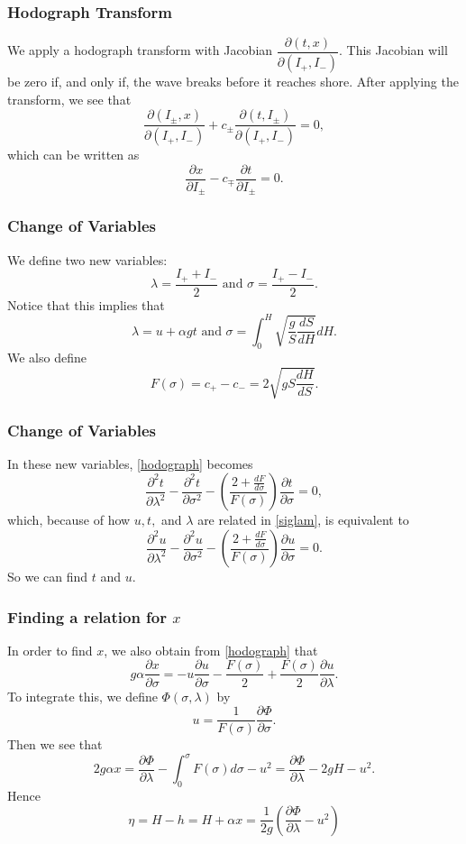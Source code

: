 \documentclass[xcolor=dvipsnames]{beamer}
\begin{document}
\begin{frame}
\frametitle{Hodograph Transform}
We apply a hodograph transform with Jacobian $\dfrac{\partial (t,x)}{\partial(I_+, I_-)}$. This Jacobian will be zero if, and only if, the wave breaks before it reaches shore. After applying the transform, we see that
\[
\frac{\partial(I_\pm,x)}{\partial(I_+,I_-)} + c_\pm \frac{\partial (t, I_\pm)}{\partial(I_+,I_-)} = 0,
\]
which can be written as
\begin{equation}\label{hodograph}
\frac{\partial x}{\partial I_\pm} - c_\mp \frac{\partial t}{\partial I_\pm} = 0.
\end{equation}
\end{frame}

\begin{frame}
\frametitle{Change of Variables}
We define two new variables:
\[
\lambda = \frac{I_+ + I_-}{2} \text{ and } \sigma = \frac{I_+ - I_-}{2}.
\]
Notice that this implies that
\begin{equation} \label{siglam}
\lambda = u + \alpha g t \text{ and } \sigma = \int_0^H \sqrt{\frac{g}{S} \frac{dS}{dH}}dH.
\end{equation}
We also define
\[
F(\sigma) = c_+ - c_- = 2 \sqrt{gS \frac{dH}{dS}}.
\]
\end{frame}

\begin{frame}
\frametitle{Change of Variables}
In these new variables, \eqref{hodograph} becomes
\[
\frac{\partial^2 t}{\partial \lambda^2} - \frac{\partial^2 t}{\partial \sigma^2} - \left( \frac{2 + \frac{dF}{d\sigma}}{F(\sigma)} \right) \frac{\partial t}{\partial \sigma} = 0,
\]
which, because of how $u,t,$ and $\lambda$ are related in \eqref{siglam}, is equivalent to
\begin{equation}\label{finalu}
\frac{\partial^2 u}{\partial \lambda^2} - \frac{\partial^2 u}{\partial \sigma^2} - \left( \frac{2 + \frac{dF}{d\sigma}}{F(\sigma)} \right) \frac{\partial u}{\partial \sigma} = 0.
\end{equation}
So we can find $t$ and $u$.
\end{frame}

\begin{frame}
\frametitle{Finding a relation for $x$}
In order to find $x$, we also obtain from \eqref{hodograph} that
\[
g \alpha \frac{\partial x}{\partial \sigma} = - u \frac{\partial u}{\partial \sigma} - \frac{F(\sigma)}{2} + \frac{F(\sigma)}{2} \frac{\partial u}{\partial \lambda}.
\]
To integrate this, we define $\Phi(\sigma,\lambda)$ by
\[
u = \frac{1}{F(\sigma)} \frac{\partial \Phi}{\partial \sigma}.
\]
Then we see that
\[
2 g \alpha x = \frac{\partial \Phi}{\partial \lambda} - \int_0^\sigma F(\sigma) d\sigma - u^2 = \frac{\partial \Phi}{\partial \lambda} - 2gH - u^2.
\]
Hence
\[
\eta = H - h = H + \alpha x = \frac{1}{2g} \left(\frac{\partial \Phi}{\partial \lambda} - u^2 \right)
\]
\end{frame}
\end{document}
